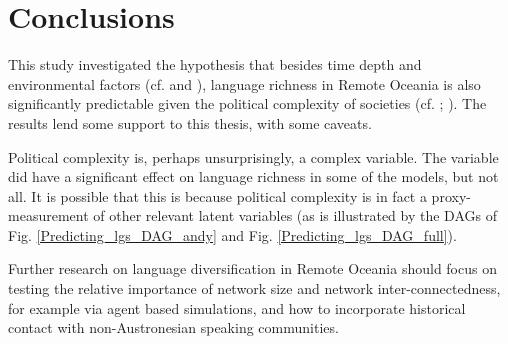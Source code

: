\documentclass[unnumsec,webpdf,modern,medium]{oup-authoring-template}
\begin{document}
\FloatBarrier
\section{Conclusions}
This study investigated the hypothesis that besides time depth and environmental factors (cf. \citet{curriemace2009, gavin2012island, hua2019ecological} and \citet{Pacheco_Coelho_2019}), language richness in Remote Oceania is also significantly predictable given the political complexity of societies (cf. \citet{turner1884}; \citet{pawley81, pawley2007}). The results lend some support to this thesis, with some caveats. 

Political complexity is, perhaps unsurprisingly, a complex variable. The variable did have a significant effect on language richness in some of the models, but not all. It is possible that this is because political complexity is in fact a proxy-measurement of other relevant latent variables (as is illustrated by the DAGs of Fig. \ref{Predicting_lgs_DAG_andy} and Fig. \ref{Predicting_lgs_DAG_full}).

Further research on language diversification in Remote Oceania should focus on testing the relative importance of network size and network inter-connectedness, for example via agent based simulations, and how to incorporate historical contact with non-Austronesian speaking communities.






\end{document}
